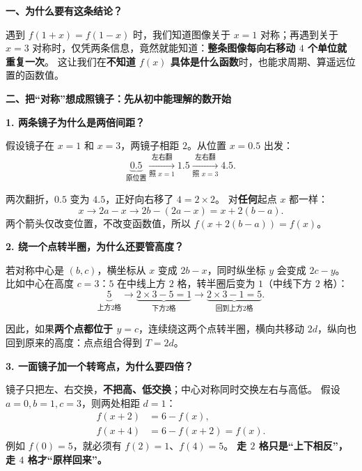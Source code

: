 \clearpage
\begin{explanationbox}
\textbf{\textcolor{CExplanation}{一、为什么要有这条结论？}}



遇到 $f(1+x)=f(1-x)$ 时，我们知道图像关于 $x=1$ 对称；再遇到关于 $x=3$ 对称时，仅凭两条信息，竟然就能知道：\textbf{整条图像每向右移动 $4$ 个单位就重复一次}。
这让我们在\textbf{不知道 $f(x)$ 具体是什么函数}时，也能求周期、算遥远位置的函数值。

\medskip

\end{explanationbox}
\clearpage
\begin{explanationbox}
\textbf{\textcolor{CExplanation}{二、把“对称”想成照镜子：先从初中能理解的数开始}}



\textbf{1. 两条镜子为什么是两倍间距？}

假设镜子在 $x=1$ 和 $x=3$，两镜子相距 $2$。从位置 $x=0.5$ 出发：
\[
\underbrace{0.5}_{\text{原位置}}
\xrightarrow[\text{照 }x=1]{\text{左右翻}}
1.5
\xrightarrow[\text{照 }x=3]{\text{左右翻}}
4.5.
\]

两次翻折，$0.5$ 变为 $4.5$，正好向右移了 $4=2\times2$。
对\textbf{任何}起点 $x$ 都一样：
\[
 x\longrightarrow 2a-x\longrightarrow 2b-(2a-x)=x+2(b-a).
\]
两个箭头仅改变位置，不改变函数值，所以 $f(x+2(b-a))=f(x)$。

\textbf{2. 绕一个点转半圈，为什么还要管高度？}

若对称中心是 $(b,c)$，横坐标从 $x$ 变成 $2b-x$，同时纵坐标 $y$ 会变成 $2c-y$。
比如中心在高度 $c=3$：$5$ 在中线上方 $2$ 格，转半圈后变为 $1$（中线下方 $2$ 格）：
\[
 \underbrace{5}_{\text{上方2格}}\longrightarrow \underbrace{2\times3-5=1}_{\text{下方2格}}
 \longrightarrow \underbrace{2\times3-1=5}_{\text{回到上方2格}}.
\]

因此，如果\textbf{两个点都位于 $y=c$}，连续绕这两个点转半圈，横向共移动 $2d$，纵向也回到原来的高度：点点组合得到 $T=2d$。

\end{explanationbox}\clearpage\begin{explanationbox}

\textbf{3. 一面镜子加一个转弯点，为什么要四倍？}

镜子只把左、右交换，\textbf{不把高、低交换}；中心对称同时交换左右与高低。
假设 $a=0,b=1,c=3$，则两处相距 $d=1$：
\[
\begin{aligned}
  f(x+2)&=6-f(x),\\
  f(x+4)&=6-f(x+2)=f(x).
\end{aligned}
\]
例如 $f(0)=5$，就必须有 $f(2)=1$、$f(4)=5$。
\textbf{走 $2$ 格只是“上下相反”，走 $4$ 格才“原样回来”。}

\medskip

\end{explanationbox}
